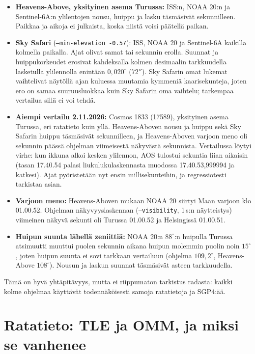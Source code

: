 \documentclass[a4paper,11pt]{article}
\newcommand{\koodi}[1]{\texttt{#1}}
\begin{document}
\begin{itemize}
  \item \textbf{Heavens-Above, yksityinen asema Turussa:} ISS:n, NOAA 20:n ja Sentinel-6A:n
    ylilentojen nousu, huippu ja lasku täsmäsivät sekunnilleen. Paikkaa ja aikoja ei julkaista, koska niistä voisi päätellä
    paikan.
  \item \textbf{Sky Safari} (\koodi{--min-elevation -0.57}): ISS, NOAA 20 ja Sentinel-6A
    kaikilla kolmella paikalla. Ajat olivat samat tai sekunnin erolla. Suunnat ja
    huippukorkeudet erosivat kahdeksalla kolmen desimaalin tarkkuudella lasketulla
    ylilennolla enintään $0{,}020^\circ$ ($72''$). Sky Safarin omat lukemat vaihtelivat
    näytöllä ajan kuluessa muutamia kymmeniä kaarisekunteja, joten ero on samaa
    suuruusluokkaa kuin Sky Safarin oma vaihtelu; tarkempaa vertailua sillä ei voi tehdä.
  \item \textbf{Aiempi vertailu 2.11.2026:} Cosmos 1833 (17589), yksityinen asema Turussa,
    eri ratatieto kuin yllä. Heavens-Aboven nousu ja huippu sekä Sky Safarin huippu täsmäsivät
    sekunnilleen, ja Heavens-Aboven varjoon meno oli sekunnin päässä ohjelman viimeisestä
    näkyvästä sekunnista. Vertailussa löytyi virhe: kun ikkuna alkoi kesken ylilennon, AOS
    tulostui sekuntia liian aikaisin (tasan 17.40.54 palasi liukulukulaskennasta muodossa
    17.40.53,999994 ja katkesi). Ajat pyöristetään nyt ensin millisekunteihin, ja
    regressiotesti tarkistaa asian.
  \item \textbf{Varjoon meno:} Heavens-Aboven mukaan NOAA 20 siirtyi Maan varjoon klo
    01.00.52. Ohjelman näkyvyyslaskennan (\koodi{--visibility}, 1\,s:n näytteistys) viimeinen
    näkyvä sekunti oli Turussa 01.00.52 ja Helsingissä 01.00.51.
  \item \textbf{Huipun suunta lähellä zeniittiä:} NOAA 20:n $88^\circ$:n huipulla Turussa
    atsimuutti muuttui puolen sekunnin aikana huipun molemmin puolin noin $15^\circ$, joten
    huipun suunta ei sovi tarkkaan vertailuun (ohjelma $109{,}2^\circ$, Heavens-Above
    $108^\circ$). Nousun ja laskun suunnat täsmäsivät asteen tarkkuudella.
\end{itemize}
Tämä on hyvä yhtäpitävyys, mutta ei riippumaton tarkistus radasta: kaikki kolme ohjelmaa
käyttävät todennäköisesti samoja ratatietoja ja SGP4:ää.

\section{Ratatieto: TLE ja OMM, ja miksi se vanhenee}\label{sec:tle}
\end{document}
